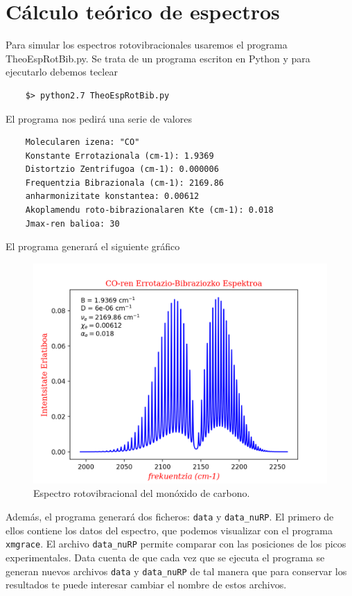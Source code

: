 \documentclass{tufte-book}
\begin{document}
\section{Cálculo teórico de espectros}
Para simular los espectros rotovibracionales usaremos 
el programa TheoEspRotBib.py. Se trata de un programa
escriton en Python y para ejecutarlo debemos teclear
\begin{verbatim}
    $> python2.7 TheoEspRotBib.py
\end{verbatim}
El programa nos pedirá una serie de valores
\small{
\begin{verbatim}
    Molecularen izena: "CO"
    Konstante Errotazionala (cm-1): 1.9369
    Distortzio Zentrifugoa (cm-1): 0.000006
    Frequentzia Bibrazionala (cm-1): 2169.86
    anharmonizitate konstantea: 0.00612
    Akoplamendu roto-bibrazionalaren Kte (cm-1): 0.018
    Jmax-ren balioa: 30
\end{verbatim}
}
El programa generará el siguiente gráfico  
\begin{figure}
    \centering
    \includegraphics{figs/Figure_1.png}
    \caption{Espectro rotovibracional del monóxido de carbono.}
    \label{fig:espectro}
\end{figure}

Además, el programa generará dos ficheros: \texttt{data} y 
\texttt{data\_nuRP}. El primero de ellos contiene los datos 
del espectro, que podemos visualizar con el programa 
\texttt{xmgrace}. El archivo \texttt{data\_nuRP} permite 
comparar con las posiciones de los picos experimentales.
Data cuenta de que cada vez que se ejecuta el programa 
se generan nuevos archivos \texttt{data} y \texttt{data\_nuRP}
de tal manera que para conservar los resultados te puede 
interesar cambiar el nombre de estos archivos.
\end{document}
